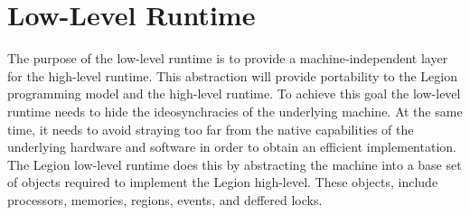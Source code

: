 \section{Low-Level Runtime}
\label{sec:lowlevel}

The purpose of the low-level runtime is to provide a machine-independent layer
for the high-level runtime.  This abstraction will provide portability to the Legion
programming model and the high-level runtime.  To achieve this goal the low-level
runtime needs to hide the ideosynchracies of the underlying machine.  At the same time, it needs to avoid 
straying too far from the native capabilities of the underlying hardware 
and software in order to obtain an efficient implementation.  The Legion
low-level runtime does this by abstracting the machine into a base set
of objects required to implement the Legion high-level.  These objects,
include processors, memories, regions, events, and deffered locks.






